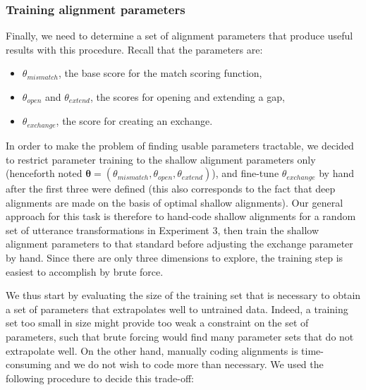\subsubsection{Training alignment
parameters}\label{training-alignment-parameters}

Finally, we need to determine a set of alignment parameters that produce
useful results with this procedure. Recall that the parameters are:

\begin{itemize}
\item
  \(\theta_{mismatch}\), the base score for the match scoring function,
\item
  \(\theta_{open}\) and \(\theta_{extend}\), the scores for opening and
  extending a gap,
\item
  \(\theta_{exchange}\), the score for creating an exchange.
\end{itemize}

In order to make the problem of finding usable parameters tractable, we
decided to restrict parameter training to the shallow alignment
parameters only (henceforth noted
\(\bm{\theta} = (\theta_{mismatch}, \theta_{open}, \theta_{extend})\)),
and fine-tune \(\theta_{exchange}\) by hand after the first three were
defined (this also corresponds to the fact that deep alignments are made
on the basis of optimal shallow alignments). Our general approach for
this task is therefore to hand-code shallow alignments for a random set
of utterance transformations in Experiment 3, then train the shallow
alignment parameters to that standard before adjusting the exchange
parameter by hand. Since there are only three dimensions to explore, the
training step is easiest to accomplish by brute force.

We thus start by evaluating the size of the training set that is
necessary to obtain a set of parameters that extrapolates well to
untrained data. Indeed, a training set too small in size might provide
too weak a constraint on the set of parameters, such that brute forcing
would find many parameter sets that do not extrapolate well. On the
other hand, manually coding alignments is time-consuming and we do not
wish to code more than necessary. We used the following procedure to
decide this trade-off:

